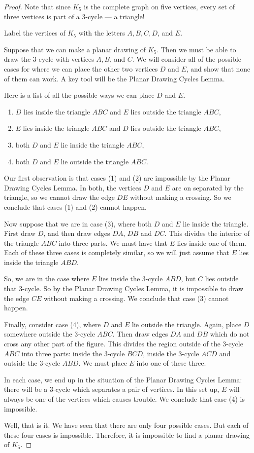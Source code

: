 \documentclass[12pt,letterpaper]{article}
\theoremstyle{definition}
\begin{document}
\begin{proof}
Note that since $K_5$ is the complete graph on five vertices, every set of three vertices is part of a 3-cycle --- a triangle!

Label the vertices of $K_5$ with the letters $A, B, C, D$, and $E$.

Suppose that we can make a planar drawing of $K_5$. Then we must be able to draw the 3-cycle with vertices $A, B$, and $C$.  We will consider all of the possible cases for where we can place the other two vertices $D$ and $E$, and show that none of them can work. A key tool will be the Planar Drawing Cycles Lemma.

Here is a list of all the possible ways we can place $D$ and $E$.
\begin{enumerate}
\item $D$ lies inside the triangle $ABC$ and $E$ lies outside the triangle $ABC$,
\item $E$ lies inside the triangle $ABC$ and $D$ lies outside the triangle $ABC$,
\item both $D$ and $E$ lie inside the triangle $ABC$, 
\item both $D$ and $E$ lie outside the triangle $ABC$.
\end{enumerate}

Our first observation is that cases (1) and (2) are impossible by the Planar Drawing Cycles Lemma. In both, the vertices $D$ and $E$ are on separated by the triangle, so we cannot draw the edge $DE$ without making a crossing.
So we conclude that cases (1) and (2) cannot happen.

Now suppose that we are in case (3), where both $D$ and $E$ lie inside the triangle. First draw $D$, and then draw 
edges $DA$, $DB$ and $DC$. This divides the interior of the triangle $ABC$ into three parts. We must have that $E$
lies inside one of them. Each of these three cases is completely similar, so we will just assume that $E$ lies inside
the triangle $ABD$. 

So, we are in the case where $E$ lies inside the 3-cycle $ABD$, but $C$ lies outside that 3-cycle. So by the Planar
Drawing Cycles Lemma, it is impossible to draw the edge $CE$ without making a crossing. We conclude that case (3)
cannot happen.

Finally, consider case (4), where $D$ and $E$ lie outside the triangle. Again, place $D$ somewhere outside the
3-cycle $ABC$. Then draw edges $DA$ and  $DB$ which do not cross any other part of the figure. This divides 
the region outside of the 3-cycle $ABC$ into three parts: inside the 3-cycle $BCD$, inside the 3-cycle $ACD$ and outside the 3-cycle $ABD$. We must place $E$ into one of these three.

In each case, we end up in the situation of the Planar Drawing Cycles Lemma: there will be a 3-cycle which separates
a pair of vertices. In this set up, $E$ will always be one of the vertices which causes trouble. We conclude that case (4) is impossible.

Well, that is it. We have seen that there are only four possible cases. But each of these four cases is impossible.
Therefore, it is impossible to find a planar drawing of $K_5$.
\end{proof}
\end{document}
